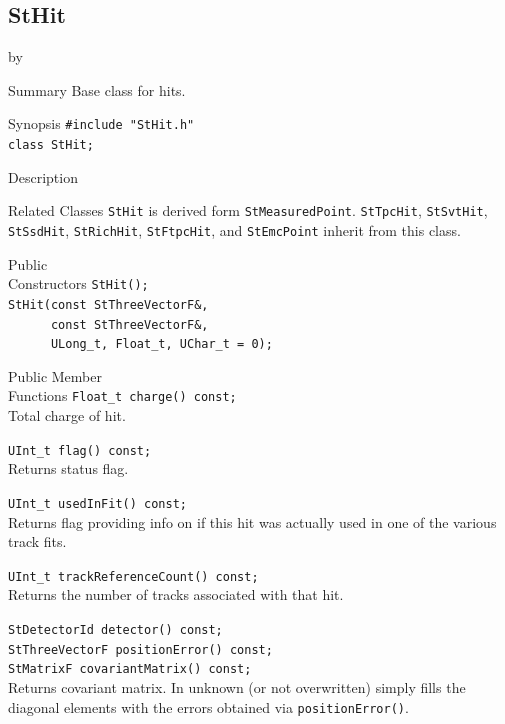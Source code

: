 \documentclass[twoside]{article}
\newcommand{\entrylabel}[1]{\mbox{\textbf{{#1}}}\hfil}%
\newenvironment{entry}
{\begin{list}{}%
    {\renewcommand{\makelabel}{\entrylabel}%
     \setlength{\labelwidth}{90pt}%
     \setlength{\leftmargin}{\labelwidth}
     \advance\leftmargin by \labelsep%
      }%
    }%
  {\end{list}}
\newcommand{\Entrylabel}[1]%
{\raisebox{0pt}[1ex][0pt]{\makebox[\labelwidth][l]%
    {\parbox[t]{\labelwidth}{\hspace{0pt}\textbf{{#1}}}}}}
\newenvironment{Entry}%
{\renewcommand{\entrylabel}{\Entrylabel}\begin{entry}}%
  {\end{entry}}
\begin{document}
\subsection{StHit}
\label{sec:StHit}
\begin{Entry}
\item[Summary] Base class for hits.
    
\item[Synopsis]
    \verb+#include "StHit.h"+\\
    \verb+class StHit;+\\
\item[Description]
    
\item[Related Classes]
    \texttt{StHit} is derived form
    \texttt{StMeasuredPoint}. \texttt{StTpcHit}, \texttt{StSvtHit},
    \texttt{StSsdHit}, \texttt{StRichHit}, \texttt{StFtpcHit}, and
    \texttt{StEmcPoint} inherit from this class.
        
\item[Public\\ Constructors]
    \verb+StHit();+\\
    \verb+StHit(const StThreeVectorF&,+\\
    \verb+      const StThreeVectorF&,+\\
    \verb+      ULong_t, Float_t, UChar_t = 0);+\\
    
\item[Public Member\\ Functions]
    \verb+Float_t charge() const;+\\
    Total charge of hit.
    
    \verb+UInt_t flag() const;+\\
    Returns status flag.
    
    \verb+UInt_t usedInFit() const;+\\
    Returns flag providing info on if this hit was actually used in one
    of the various track fits.
    
    \verb+UInt_t trackReferenceCount() const;+\\
    Returns the number of tracks associated with that hit.
    
    \verb+StDetectorId detector() const;+\\

    \verb+StThreeVectorF positionError() const;+\\

    \verb+StMatrixF covariantMatrix() const;+\\
    Returns covariant matrix. In unknown (or not overwritten) simply fills
    the diagonal elements with the errors obtained via \texttt{positionError()}.
    

\end{Entry}
\end{document}
